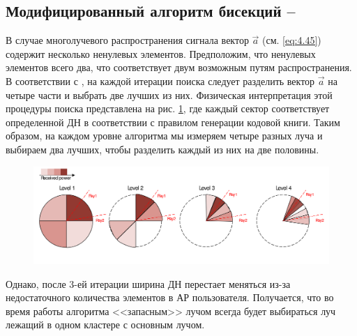 \subsection[Модифицированный алгоритм бисекций]{Модифицированный алгоритм бисекций -- \ACS}
\label{sec:Compressive:multipath}
В случае многолучевого распространения сигнала вектор $\vec a$  (см. \eqref{eq:4.45}) содержит
несколько ненулевых элементов. Предположим, что ненулевых элементов всего два, что соответствует 
двум возможным путям распространения.
В соответствии с \cite{Alkhateeb2014}, на 
каждой итерации поиска следует разделить вектор $\vec a$ на четыре части и
выбрать две лучших из них.  Физическая интерпретация этой процедуры поиска
представлена на рис. \ref{fig:4.27}, где каждый сектор соответствует определенной
ДН в соответствии с правилом генерации кодовой книги. Таким
образом, на каждом уровне алгоритма мы измеряем четыре разных луча и выбираем
два лучших, чтобы разделить каждый из них на две половины.
\begin{figure}[h!]
    \centering
    \includegraphics[width=\linewidth]{figs/fig4.27}
    \caption{}
    \label{fig:4.27}
\end{figure}
Однако, после 3-ей итерации ширина ДН перестает меняться из-за недостаточного количества 
элементов в АР пользователя. Получается, что 
во время работы алгоритма <<запасным>> лучом всегда будет выбираться
луч лежащий в одном кластере с основным лучом. 

